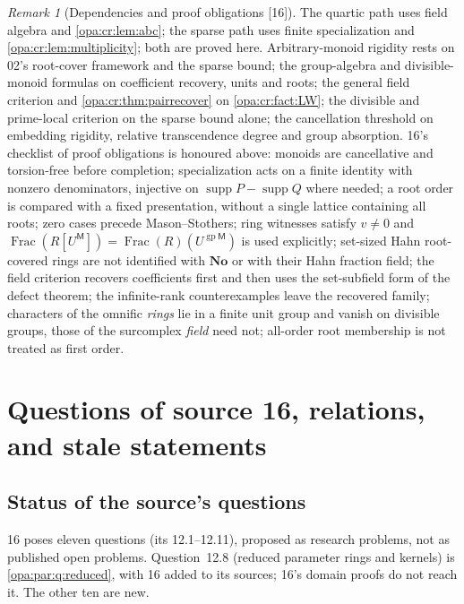 \documentclass[11pt,oneside]{article}
\numberwithin{equation}{section}
\theoremstyle{definition}
\theoremstyle{remark}
\newtheorem{remark}[remark]{Remark}
\newcommand{\No}{\mathbf{No}}
\newcommand{\supp}{\operatorname{supp}}
\newcommand{\Frac}{\operatorname{Frac}}
\newcommand{\src}[1]{\textup{\textsf{\small[#1]}}}
\begin{document}
\begin{remark}[Dependencies and proof obligations \src{16}]\label{opa:cr:rem:dependencies}
The quartic path uses field algebra and \cref{opa:cr:lem:abc}; the sparse path uses finite specialization and
\cref{opa:cr:lem:multiplicity}; both are proved here. Arbitrary-monoid rigidity rests on 02's root-cover framework and the
sparse bound; the group-algebra and divisible-monoid formulas on coefficient recovery, units and roots; the general field
criterion and \cref{opa:cr:thm:pairrecover} on \cref{opa:cr:fact:LW}; the divisible and prime-local criterion on the sparse bound
alone; the cancellation threshold on embedding rigidity, relative transcendence degree and group absorption. 16's checklist of
proof obligations is honoured above: monoids are cancellative and torsion-free before completion; specialization acts on a
finite identity with nonzero denominators, injective on $\supp P-\supp Q$ where needed; a root order is compared with a fixed
presentation, without a single lattice containing all roots; zero cases precede Mason--Stothers; ring witnesses satisfy
$v\ne0$ and $\Frac(R[U^{\mathsf M}])=\Frac(R)(U^{\operatorname{gp}\mathsf M})$ is used explicitly; set-sized Hahn root-covered rings are not
identified with $\No$ or with their Hahn fraction field; the field criterion recovers coefficients first and then uses the
set-subfield form of the defect theorem; the infinite-rank counterexamples leave the recovered family; characters of the
omnific \emph{rings} lie in a finite unit group and vanish on divisible groups, those of the surcomplex \emph{field} need not;
all-order root membership is not treated as first order.
\end{remark}

\section{Questions of source 16, relations, and stale statements}\label{opa:cr:sec:questions}

\subsection{Status of the source's questions}\label{opa:cr:sub:status}

16 poses eleven questions (its 12.1--12.11), proposed as research problems, not as published open problems. Question~12.8
(reduced parameter rings and kernels) is \cref{opa:par:q:reduced}, with 16 added to its sources; 16's domain proofs do not
reach it. The other ten are new.
\end{document}
